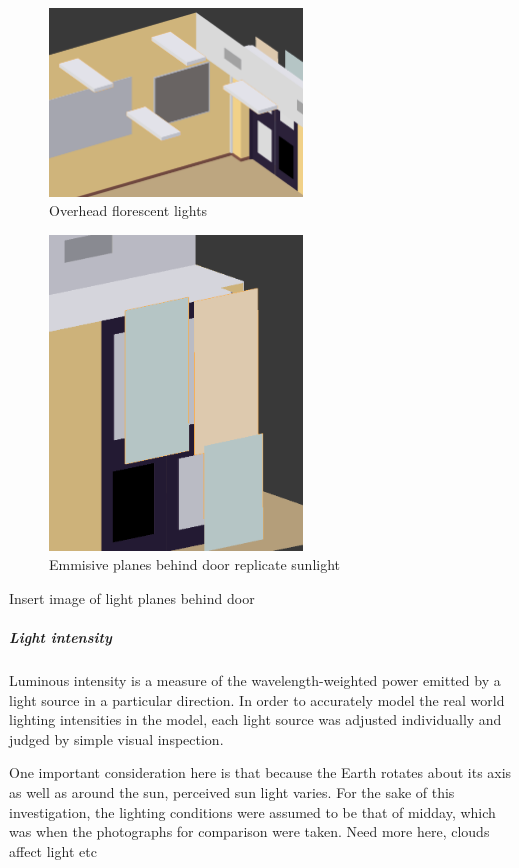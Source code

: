 \documentclass[11pt,a4paper]{report}
\begin{document}
						\begin{figure}[h!]
							\centering
							\includegraphics[width=0.6\textwidth]{overhead_lights}
							\caption{Overhead florescent lights}
						\end{figure}
						\begin{figure}[h!]
							\centering
							\includegraphics[width=0.6\textwidth]{lights_behind_door}
							\caption{Emmisive planes behind door replicate sunlight}
						\end{figure}
						{{Insert image of light planes behind door}}
					
					\subparagraph{Light intensity}
						Luminous intensity is a measure of the wavelength-weighted power emitted by a light source in a particular direction. In order to accurately model the real world lighting intensities in the model, each light source was adjusted individually and judged by simple visual inspection. 
						
						One important consideration here is that because the Earth rotates about its axis as well as around the sun, perceived sun light varies. For the sake of this investigation, the lighting conditions were assumed to be that of midday, which was when the photographs for comparison were taken. {{Need more here, clouds affect light etc}}
						
\end{document}
